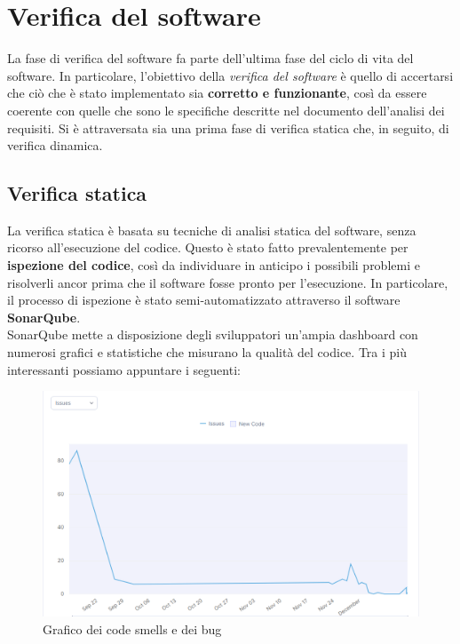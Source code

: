 
\chapter{Verifica del software}
    La fase di verifica del software fa parte dell'ultima fase del ciclo di vita del software. In particolare, l'obiettivo della \textit{verifica del software} è quello di accertarsi che ciò che è stato implementato sia \textbf{corretto e funzionante}, così da essere coerente con quelle che sono le specifiche descritte nel documento dell'analisi dei requisiti. Si è attraversata sia una prima fase di verifica statica che, in seguito, di verifica dinamica.

    \section{Verifica statica}
        La verifica statica è basata su tecniche di analisi statica del software, senza ricorso all'esecuzione del codice. Questo è stato fatto prevalentemente per \textbf{ispezione del codice}, così da individuare in anticipo i possibili problemi e risolverli ancor prima che il software fosse pronto per l'esecuzione. In particolare, il processo di ispezione è stato semi-automatizzato attraverso il software \textbf{SonarQube}. \\
        SonarQube mette a disposizione degli sviluppatori un'ampia dashboard con numerosi grafici e statistiche che misurano la qualità del codice.
        Tra i più interessanti possiamo appuntare i seguenti: \\
        \begin{figure}[htbp!]
            \centering
            \includegraphics[width=0.7\linewidth]{Immagini/Verifica Software/Issues.png}
            \caption{Grafico dei code smells e dei bug}
        \end{figure} \\

